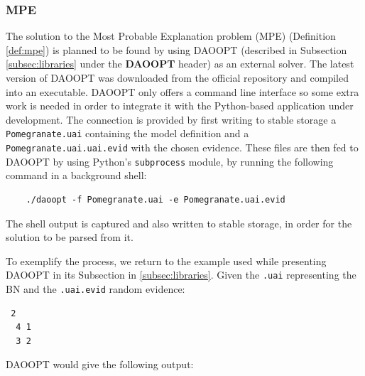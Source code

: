 \subsubsection{MPE}
The solution to the Most Probable Explanation problem (MPE) (Definition \ref{def:mpe}) is planned to be found by using DAOOPT (described in Subsection \ref{subsec:libraries} under the \textbf{DAOOPT} header) as an external solver.
The latest version of DAOOPT was downloaded from the official repository \citep{daoopt} and compiled into an executable.
DAOOPT only offers a command line interface so some extra work is needed in order to integrate it with the Python-based application under development.
The connection is provided by first writing to stable storage a \texttt{Pomegranate.uai} containing the model definition and a \texttt{Pomegranate.uai.uai.evid} with the chosen evidence.
These files are then fed to DAOOPT by using Python's \texttt{subprocess} module, by running the following command in a background shell:
\begin{verbatim}
	./daoopt -f Pomegranate.uai -e Pomegranate.uai.evid
\end{verbatim}
The shell output is captured and also written to stable storage, in order for the solution to be parsed from it.

To exemplify the process, we return to the example used while presenting DAOOPT in its Subsection in \ref{subsec:libraries}.
Given the \texttt{.uai} representing the BN and the \texttt{.uai.evid} random evidence:
\begin{framed}
\begin{verbatim}
 2
  4 1
  3 2
\end{verbatim}
\end{framed}

DAOOPT would give the following output:


